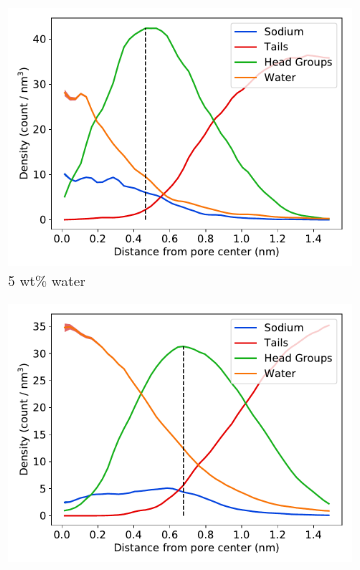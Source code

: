 \documentclass{article}
\begin{document}
  \begin{figure}
  \centering
  \begin{subfigure}{0.49\linewidth}
  \includegraphics[width=\linewidth]{component_density_5wt.pdf}
  \caption{5 wt\% water}\label{fig:component_density_5wt}
  \end{subfigure}
  \begin{subfigure}{0.49\linewidth}
  \includegraphics[width=\linewidth]{component_density_10wt.pdf}

\end{subfigure}
\end{figure}
\end{document}
